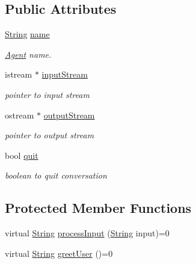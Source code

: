 \subsection*{Public Attributes}
\begin{DoxyCompactItemize}
\item 
\mbox{\label{classAgent_a18b65b5aff8b98ba9316d6b75b5fc365}} 
\mbox{\hyperlink{classString}{String}} \mbox{\hyperlink{classAgent_a18b65b5aff8b98ba9316d6b75b5fc365}{name}}
\begin{DoxyCompactList}\small\item\em \mbox{\hyperlink{classAgent}{Agent}} name. \end{DoxyCompactList}\item 
\mbox{\label{classAgent_af9d3de27eff21068dca2e7d73f6bdd3e}} 
istream $\ast$ \mbox{\hyperlink{classAgent_af9d3de27eff21068dca2e7d73f6bdd3e}{input\+Stream}}
\begin{DoxyCompactList}\small\item\em pointer to input stream \end{DoxyCompactList}\item 
\mbox{\label{classAgent_ac00b0a19e22cbda3d748704b073f373a}} 
ostream $\ast$ \mbox{\hyperlink{classAgent_ac00b0a19e22cbda3d748704b073f373a}{output\+Stream}}
\begin{DoxyCompactList}\small\item\em pointer to output stream \end{DoxyCompactList}\item 
\mbox{\label{classAgent_ac6d993fd4391bbd272be8bcdaeab350c}} 
bool \mbox{\hyperlink{classAgent_ac6d993fd4391bbd272be8bcdaeab350c}{quit}}
\begin{DoxyCompactList}\small\item\em boolean to quit conversation \end{DoxyCompactList}\end{DoxyCompactItemize}
\subsection*{Protected Member Functions}
\begin{DoxyCompactItemize}
\item 
virtual \mbox{\hyperlink{classString}{String}} \mbox{\hyperlink{classAgent_a8908483f8d1302ec8dd65539369de9bb}{process\+Input}} (\mbox{\hyperlink{classString}{String}} input)=0
\item 
virtual \mbox{\hyperlink{classString}{String}} \mbox{\hyperlink{classAgent_a753289e615d0fbe962453695e41bd0b6}{greet\+User}} ()=0
\end{DoxyCompactItemize}
